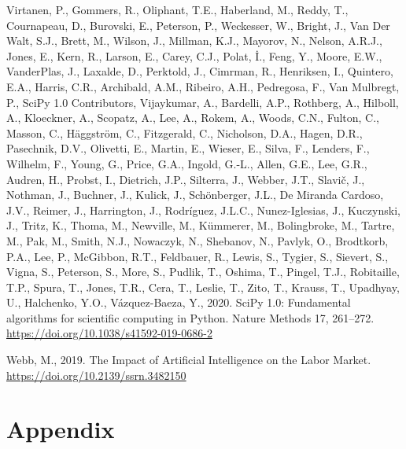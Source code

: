\documentclass[
  12pt,
  a4paperpaper,
]{article}
\newlength{\cslhangindent}
\newenvironment{CSLReferences}[2] %
 {\begin{list}{}{%
  \setlength{\itemindent}{0pt}
  \setlength{\leftmargin}{0pt}
  \setlength{\parsep}{0pt}
  \ifodd #1
   \setlength{\leftmargin}{\cslhangindent}
   \setlength{\itemindent}{-1\cslhangindent}
  \fi
  \setlength{\itemsep}{#2\baselineskip}}}
 {\end{list}}
\begin{document}
\begin{CSLReferences}{1}{0}
Virtanen, P., Gommers, R., Oliphant, T.E., Haberland, M., Reddy, T.,
Cournapeau, D., Burovski, E., Peterson, P., Weckesser, W., Bright, J.,
Van Der Walt, S.J., Brett, M., Wilson, J., Millman, K.J., Mayorov, N.,
Nelson, A.R.J., Jones, E., Kern, R., Larson, E., Carey, C.J., Polat, İ.,
Feng, Y., Moore, E.W., VanderPlas, J., Laxalde, D., Perktold, J.,
Cimrman, R., Henriksen, I., Quintero, E.A., Harris, C.R., Archibald,
A.M., Ribeiro, A.H., Pedregosa, F., Van Mulbregt, P., SciPy 1.0
Contributors, Vijaykumar, A., Bardelli, A.P., Rothberg, A., Hilboll, A.,
Kloeckner, A., Scopatz, A., Lee, A., Rokem, A., Woods, C.N., Fulton, C.,
Masson, C., Häggström, C., Fitzgerald, C., Nicholson, D.A., Hagen, D.R.,
Pasechnik, D.V., Olivetti, E., Martin, E., Wieser, E., Silva, F.,
Lenders, F., Wilhelm, F., Young, G., Price, G.A., Ingold, G.-L., Allen,
G.E., Lee, G.R., Audren, H., Probst, I., Dietrich, J.P., Silterra, J.,
Webber, J.T., Slavič, J., Nothman, J., Buchner, J., Kulick, J.,
Schönberger, J.L., De Miranda Cardoso, J.V., Reimer, J., Harrington, J.,
Rodríguez, J.L.C., Nunez-Iglesias, J., Kuczynski, J., Tritz, K., Thoma,
M., Newville, M., Kümmerer, M., Bolingbroke, M., Tartre, M., Pak, M.,
Smith, N.J., Nowaczyk, N., Shebanov, N., Pavlyk, O., Brodtkorb, P.A.,
Lee, P., McGibbon, R.T., Feldbauer, R., Lewis, S., Tygier, S., Sievert,
S., Vigna, S., Peterson, S., More, S., Pudlik, T., Oshima, T., Pingel,
T.J., Robitaille, T.P., Spura, T., Jones, T.R., Cera, T., Leslie, T.,
Zito, T., Krauss, T., Upadhyay, U., Halchenko, Y.O., Vázquez-Baeza, Y.,
2020. {SciPy} 1.0: Fundamental algorithms for scientific computing in
{Python}. Nature Methods 17, 261--272.
\url{https://doi.org/10.1038/s41592-019-0686-2}

Webb, M., 2019. The {Impact} of {Artificial} {Intelligence} on the
{Labor} {Market}. \url{https://doi.org/10.2139/ssrn.3482150}

\end{CSLReferences}

\newpage{}

\section*{Appendix}\label{sec-appendix}
\end{document}
